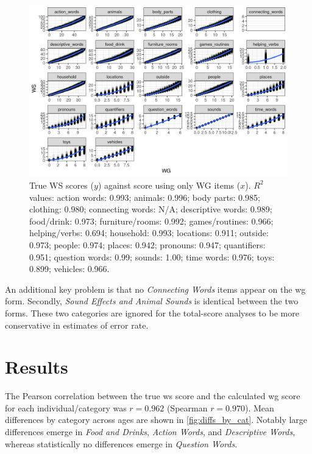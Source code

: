 \documentclass[letterpaper]{article}
\newcommand{\sounds}{\textit{Sound Effects and Animal Sounds}}
\newcommand{\cwords}{\textit{Connecting Words}}
\newcommand{\food}{\textit{Food and Drinks}}
\newcommand{\qwords}{\textit{Question Words}}
\begin{document}
    \begin{figure}
    	\centering
    	\includegraphics[width=\textwidth]{../WG2WS_plots/all_WSagainstWG}


    	\caption{True WS scores ($y$) against score using only WG items ($x$).
    		$R^2$ values: action words: 0.993; animals: 0.996; body parts: 0.985;
    		clothing: 0.980; connecting words: N/A;
    		descriptive words: 0.989; food/drink: 0.973;
    		furniture/rooms: 0.992; games/routines: 0.966; helping/verbs: 0.694;
    		household: 0.993; locations: 0.911; outside: 0.973; people: 0.974;
    		places: 0.942; pronouns: 0.947; quantifiers: 0.951;
    		question words: 0.99; sounds: 1.00; time words: 0.976; toys: 0.899;
    		vehicles: 0.966.}

    	\label{fig:allWGWS}

    \end{figure}

    An additional key problem is that no \cwords{} items appear on the \gls{wg}
    form. Secondly, \sounds{} is identical between the two forms. These two categories are
    ignored for the total-score analyses to be more conservative in estimates of error rate.

    \section{Results}

    The Pearson correlation between the true \gls{ws} score and the calculated
    \gls{wg} score for each individual/category was $r=0.962$ (Spearman $r=0.970$).
    Mean differences
    by category across ages are shown in \autoref{fig:diffs_by_cat}. Notably
    large differences emerge in \food{}, \textit{Action Words},
    and \textit{Descriptive Words}, whereas statistically no differences emerge
    in \qwords{}.
\end{document}
